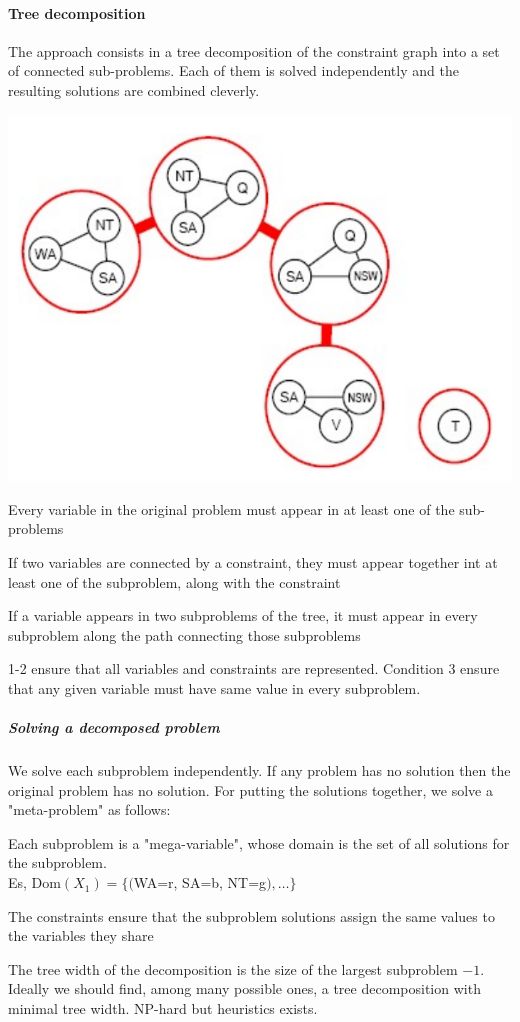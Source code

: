\documentclass[10pt]{report}
\begin{document}
\paragraph{Tree decomposition} The approach consists in a tree decomposition of the constraint graph into a set of connected sub-problems. Each of them is solved independently and the resulting solutions are combined cleverly.
\begin{center}
	\includegraphics[scale=0.5]{10.png}
\end{center}
\begin{list}{}{}
	\item Every variable in the original problem must appear in at least one of the sub-problems
	\item If two variables are connected by a constraint, they must appear together int at least one of the subproblem, along with the constraint
	\item If a variable appears in two subproblems of the tree, it must appear in every subproblem along the path connecting those subproblems
\end{list}
1-2 ensure that all variables and constraints are represented. Condition 3 ensure that any given variable must have same value in every subproblem.
\subparagraph{Solving a decomposed problem} We solve each subproblem independently. If any problem has no solution then the original problem has no solution. For putting the solutions together, we solve a "meta-problem" as follows:
\begin{list}{}{}
	\item Each subproblem is a "mega-variable", whose domain is the set of all solutions for the subproblem.\\
	Es, Dom$(X_1) = \{($WA=r, SA=b, NT=g$),\ldots\}$
	\item The constraints ensure that the subproblem solutions assign the same values to the variables they share
\end{list}
The tree width of the decomposition is the size of the largest subproblem $-1$. Ideally we should find, among many possible ones, a tree decomposition with minimal tree width. NP-hard but heuristics exists.
\end{document}
